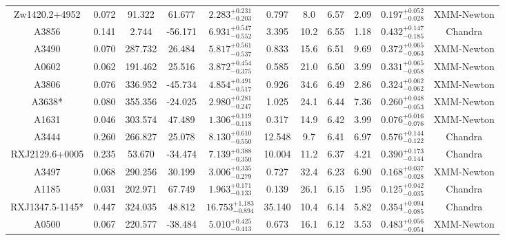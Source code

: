 \documentclass{aa}   %
\begin{document}
\begin{table}[h!]
\begin{center}
\begin{tabular}{ c  c  c  c c c c c c c c }
Zw1420.2+4952       		&		0.072	&	91.322	&	61.677	& $	2.283^{+0.231}_{-0.203}$  &      0.797	&  8.0	&	6.57	&	2.09	&	$ 0.197^{+0.052}_{-0.028}  $ &	  XMM-Newton  \\
A3856               		&		0.141	&	2.744	&	-56.171	& $	6.931^{+0.547}_{-0.552}$  &      3.395	&  10.2	&	6.55	&	1.18	&	$ 0.432^{+0.147}_{-0.185}  $ &	  Chandra     \\
A3490               		&		0.070	&	287.732	&	26.484	& $	5.817^{+0.561}_{-0.537}$  &      0.833	&  15.6	&	6.51	&	9.69	&	$ 0.372^{+0.065}_{-0.063}  $ &	 XMM-Newton   \\
A0602               		&		0.062	&	191.462	&	25.516	& $	3.872^{+0.454}_{-0.375}$  &      0.585	&  21.0	&	6.50	&	3.99	&	$ 0.331^{+0.065}_{-0.058}  $ &	  XMM-Newton  \\
A3806               		&		0.076	&	336.952	&	-45.734	& $	4.854^{+0.491}_{-0.517}$  &      0.926	&  34.6	&	6.49	&	2.86	&	$ 0.324^{+0.062}_{-0.062}  $ &	  XMM-Newton  \\
A3638*              		&		0.080	&	355.356	&	-24.025	& $	2.980^{+0.281}_{-0.247}$  &      1.025	&  24.1	&	6.44	&	7.36	&	$ 0.260^{+0.048}_{-0.053}  $ &	 XMM-Newton   \\
A1631               		&		0.046	&	303.574	&	47.489	& $	1.306^{+0.119}_{-0.118}$  &      0.317	&  14.9	&	6.42	&	3.99	&	$ 0.076^{+0.016}_{-0.076}  $ &	 XMM-Newton   \\
A3444               		&		0.260	&	266.827	&	25.078	& $	8.130^{+0.610}_{-0.550}$  &     12.548	&  9.7	&	6.41	&	6.97	&	$ 0.576^{+0.144}_{-0.122}  $ &	 Chandra      \\
RXJ2129.6+0005      		&		0.235	&	53.670	&	-34.474	& $	7.139^{+0.388}_{-0.350}$  &     10.004	&  11.2	&	6.37	&	4.21	&	$ 0.390^{+0.173}_{-0.144}  $ &	  Chandra     \\
A3497               		&		0.068	&	290.256	&	30.199	& $	3.006^{+0.335}_{-0.279}$  &      0.727	&  32.4	&	6.23	&	6.90	&	$ 0.168^{+0.037}_{-0.028}  $ &	 XMM-Newton   \\
A1185               		&		0.031	&	202.971	&	67.749	& $	1.963^{+0.171}_{-0.133}$  &      0.139	&  26.1	&	6.15	&	1.95	&	$ 0.125^{+0.042}_{-0.035}  $ &	  Chandra     \\
RXJ1347.5-1145*     		&		0.447	&	324.035	&	48.812	& $ 16.753^{+1.183}_{-0.894}$ &     35.140	&  10.4	&	6.14	&	5.82	&	$ 0.354^{+0.094}_{-0.085}  $ &	  Chandra     \\
A0500               		&		0.067	&	220.577	&	-38.484	& $	5.010^{+0.425}_{-0.413}$  &      0.673	&  16.1	&	6.12	&	3.53	&	$ 0.483^{+0.056}_{-0.054}  $ &	  XMM-Newton  \\

\end{tabular}
\end{center}
\end{table}
\end{document}
